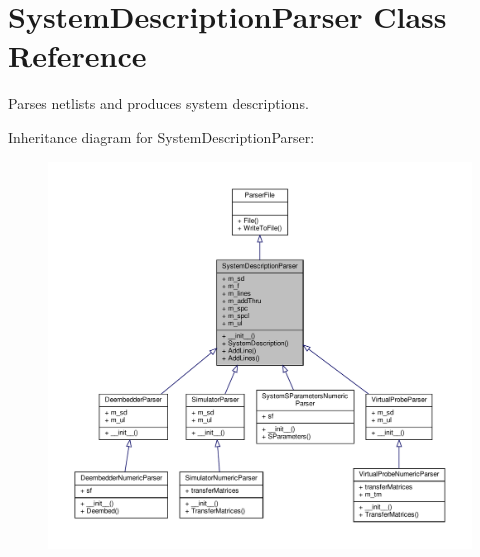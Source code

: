 \hypertarget{classSignalIntegrity_1_1Parsers_1_1SystemDescriptionParser_1_1SystemDescriptionParser}{}\section{System\+Description\+Parser Class Reference}
\label{classSignalIntegrity_1_1Parsers_1_1SystemDescriptionParser_1_1SystemDescriptionParser}


Parses netlists and produces system descriptions.  




Inheritance diagram for System\+Description\+Parser\+:\nopagebreak
\begin{figure}[H]
\begin{center}
\leavevmode
\includegraphics[width=350pt]{classSignalIntegrity_1_1Parsers_1_1SystemDescriptionParser_1_1SystemDescriptionParser__inherit__graph}
\end{center}
\end{figure}


